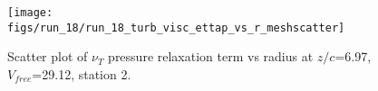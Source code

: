 \begin{figure}[H]
\centering
\texttt{[image: figs/run\_18/run\_18\_turb\_visc\_ettap\_vs\_r\_meshscatter]}
\caption{Scatter plot of $\nu_T$ pressure relaxation term vs radius at $z/c$=6.97, $V_{free}$=29.12, station 2.}
\label{fig:run_18_turb_visc_ettap_vs_r_meshscatter}
\end{figure}


